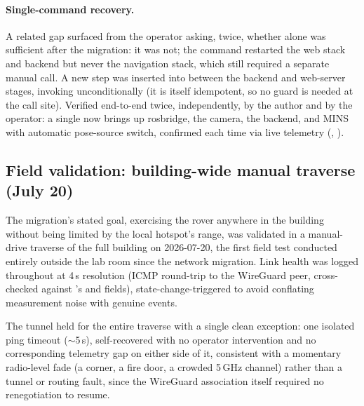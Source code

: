 \paragraph{Single-command recovery.} A related gap surfaced from the
operator asking, twice, whether  alone was sufficient
after the migration: it was not; the command restarted the web stack and
backend but never the navigation stack, which still required a separate
manual  call. A new \code{[nav]} step was inserted
into  between the backend and web-server stages, invoking
 unconditionally (it is itself idempotent, so no
guard is needed at the call site). Verified end-to-end twice, independently,
by the author and by the operator: a single  now brings up
rosbridge, the camera, the backend, and MINS with automatic pose-source
switch, confirmed each time via live telemetry (,
).

\subsection{Field validation: building-wide manual traverse (July 20)}
\label{sec:corridorvalidation}
The migration's stated goal, exercising the rover anywhere in the
building without being limited by the local hotspot's range, was
validated in a manual-drive traverse of the full building on 2026-07-20,
the first field test conducted entirely outside the lab room since the
network migration. Link health was logged throughout at 4\,s resolution
(ICMP round-trip to the WireGuard peer, cross-checked against
's  and 
fields), state-change-triggered to avoid conflating measurement noise with
genuine events.

The tunnel held for the entire traverse with a single clean exception: one
isolated ping timeout ($\sim$5\,s), self-recovered with no operator
intervention and no corresponding telemetry gap on either side of it,
consistent with a momentary radio-level fade (a corner, a fire door, a
crowded 5\,GHz channel) rather than a tunnel or routing fault, since the
WireGuard association itself required no renegotiation to resume.

